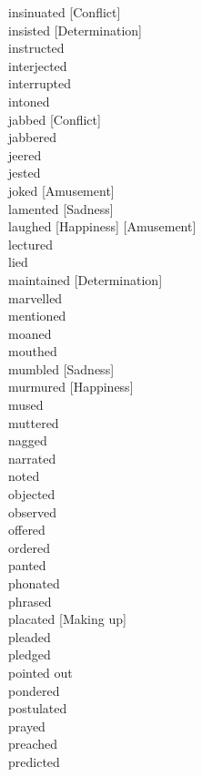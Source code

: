 insinuated [Conflict] \hfill \\
insisted [Determination] \hfill \\
instructed \hfill \\
interjected \hfill \\
interrupted \hfill \\
intoned \hfill \\
jabbed [Conflict] \hfill \\
jabbered \hfill \\
jeered \hfill \\
jested \hfill \\
joked [Amusement] \hfill \\
lamented [Sadness] \hfill \\
laughed [Happiness] [Amusement] \hfill \\
lectured \hfill \\
lied \hfill \\
maintained [Determination] \hfill \\
marvelled \hfill \\
mentioned \hfill \\
moaned \hfill \\
mouthed \hfill \\
mumbled [Sadness] \hfill \\
murmured [Happiness] \hfill \\
mused \hfill \\
muttered \hfill \\
nagged \hfill \\
narrated \hfill \\
noted \hfill \\
objected \hfill \\
observed \hfill \\
offered \hfill \\
ordered \hfill \\
panted \hfill \\
phonated \hfill \\
phrased \hfill \\
placated [Making up] \hfill \\
pleaded \hfill \\
pledged \hfill \\
pointed out \hfill \\
pondered \hfill \\
postulated \hfill \\
prayed \hfill \\
preached \hfill \\
predicted \hfill \\
